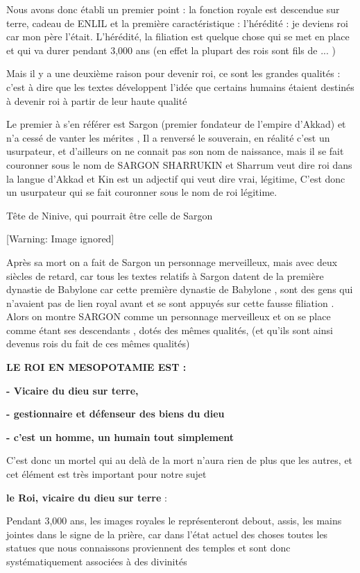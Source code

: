 \documentclass[a4paper,10pt]{article}
\begin{document}
\begin{itemize}
Nous avons donc établi un premier point : la fonction royale est
descendue sur terre, cadeau de ENLIL et la première caractéristique  :
l'hérédité : je deviens roi car mon père
l'était. L'hérédité, la filiation est
quelque chose qui se met en  place et qui va durer pendant 3,000 ans
(en effet la plupart des rois sont fils de ... )

Mais il y a une deuxième raison pour devenir roi, ce sont les grandes
qualités : c'est à dire que les textes développent
l'idée que certains humains étaient destinés à devenir
roi à partir de leur haute qualité 

Le premier à s'en référer est Sargon (premier fondateur
de l'empire d'Akkad) et
n'a cessé de vanter les mérites , Il a renversé le
souverain, en réalité c'est un usurpateur, et
d'ailleurs on ne connait pas son nom de naissance,
mais il se fait couronner sous le nom de SARGON SHARRUKIN et Sharrum
veut dire roi dans la langue d'Akkad et Kin est un
adjectif qui veut dire vrai, légitime,  C'est donc un
usurpateur qui se fait couronner sous le nom de roi légitime.

Tête de Ninive, qui pourrait être celle de Sargon

  [Warning: Image ignored] %
 

Après sa mort on a fait de Sargon un personnage merveilleux, mais avec
deux siècles de retard, car tous les textes relatifs à Sargon datent de
la première dynastie de Babylone car cette première dynastie de
Babylone , sont des gens qui n'avaient pas de lien
royal avant et se sont appuyés sur cette fausse filiation . Alors on
montre SARGON comme un personnage merveilleux et on se place comme
étant ses descendants , dotés des mêmes qualités, (et
qu'ils sont ainsi devenus rois du fait de ces mêmes
qualités)

\textbf{LE ROI EN MESOPOTAMIE EST :}

\textbf{{}- Vicaire du dieu sur terre,}

\textbf{{}- gestionnaire et défenseur des biens du dieu }

\textbf{{}- c'est un homme, un humain tout simplement}

C'est donc un mortel qui au delà de la mort
n'aura rien de plus que les autres, et cet élément est
très important pour notre sujet

\textbf{le Roi, vicaire du dieu sur terre} :  

Pendant 3,000 ans, les images royales le représenteront debout, assis,
les mains jointes dans le signe de la prière, car dans
l'état actuel des choses toutes les statues que nous
connaissons proviennent des temples et sont donc systématiquement
associées à des divinités


\end{itemize}
\end{document}
